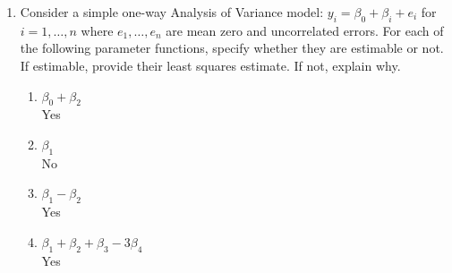 \documentclass[12pt]{article}
\begin{document}
\begin{enumerate}[leftmargin=0cm,itemindent=.5cm,labelwidth=\itemindent,labelsep=0cm,align=left]
\begin{enumerate}
\begin{proof}
\noindent Note that $\det \left(X^T X \right) = (n+1)(n+4) - (n+2)^2 = n$.  We may assume that $n \neq 0$, thus $X^T X$ is invertible.  Multiplying both sides by $(X^T X)^{-1}$ gives
$$
\begin{pmatrix}
\hat{\beta_0} \\ 
\hat{\beta_1}
\end{pmatrix}
=\frac1n
\begin{pmatrix}
n+4 & -n-2 \\
-n-2 & n+1
\end{pmatrix}
\begin{pmatrix}						%
\sum\limits_{i=1}^{n+1} Y_i \\
\sum\limits_{i=1}^{n+1} Y_i + Y_{n+1}
\end{pmatrix}
$$
$$=\frac1n
\begin{pmatrix}
2\sum\limits_{i=1}^{n+1} Y_i - (n+2)Y_{n+1} \\
- \sum\limits_{i=1}^{n+1} Y_i + (n+1)Y_{n+1}
\end{pmatrix}
=
\frac{n+1}{n}
\begin{pmatrix}
\vphantom{\sum\limits_{i=1}^{n+1} Y_i}
2\overline{Y} - \dfrac{n+2}{n+1}Y_{n+1} \\
\vphantom{\sum\limits_{i=1}^{n+1} Y_i}
-\overline{Y} + Y_{n+1}
\end{pmatrix}
$$
which is the least squares estimate of $\beta$.

\end{proof}
\end{enumerate}

\item Consider a simple one-way Analysis of Variance model: $y_i = \beta_0 + \beta_i + e_i$ for $i = 1, \dots , n$ where $e_1, \dots , e_n$ are mean zero and uncorrelated errors.  For each of the following parameter functions, specify whether they are estimable or not.  If estimable, provide their least squares estimate.  If not, explain why.

\begin{enumerate}
\item $\beta_0 + \beta_2$ \\ Yes
\item $\beta_1$ \\ No
\item $\beta_1 - \beta_2$ \\ Yes
\item $\beta_1 + \beta_2 + \beta_3 - 3\beta_4$ \\ Yes
\end{enumerate}


\end{enumerate}
\end{document}
